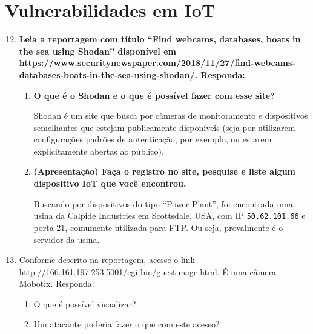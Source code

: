 \documentclass{article}
\newcommand{\code}[1]{\texttt{#1}}
\begin{document}
    \section{Vulnerabilidades em IoT}

    \begin{enumerate}
        \setcounter{enumi}{11}
        \item \textbf{Leia a reportagem com título ``Find webcams, databases,
            boats in the sea using Shodan'' disponível em
            \url{https://www.securitynewspaper.com/2018/11/27/find-webcams-databases-boats-in-the-sea-using-shodan/}.
            Responda:}

            \begin{enumerate}
                \item \textbf{O que é o Shodan e o que é possível fazer com esse site?}

                    Shodan é um site que busca por câmeras de monitoramento e
                    dispositivos semelhantes que estejam publicamente
                    disponíveis (seja por utilizarem configurações padrões de
                    autenticação, por exemplo, ou estarem explicitamente
                    abertas ao público).

                \item \textbf{(Apresentação) Faça o registro no site, pesquise
                    e liste algum dispositivo IoT que você encontrou.}

                    Buscando por dispositivos do tipo ``Power Plant'', foi
                    encontrada uma usina da Calpide Industries em Scottsdale,
                    USA, com IP \code{50.62.101.66} e porta 21, comumente
                    utilizada para FTP. Ou seja, provalmente é o servidor da
                    usina.
            \end{enumerate}

        \item Conforme descrito na reportagem, acesse o link
            \url{http://166.161.197.253:5001/cgi-bin/guestimage.html}. É uma
            câmera Mobotix. Responda:

            \begin{enumerate}
                \item O que é possível visualizar?
                \item Um atacante poderia fazer o que com este acesso?
            \end{enumerate}
    \end{enumerate}
\end{document}
